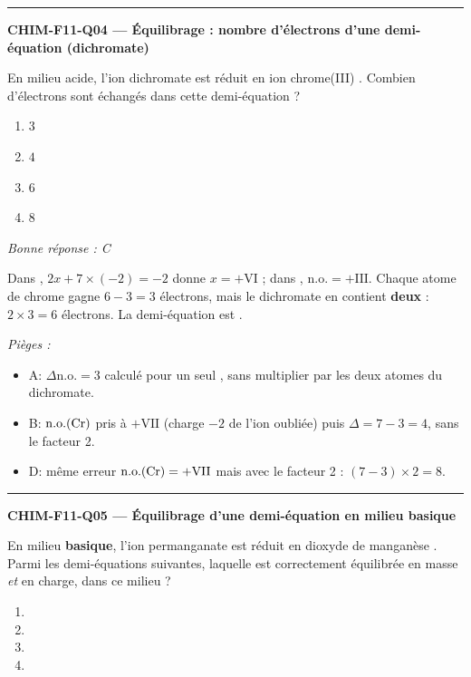\documentclass[11pt,a4paper]{article}
\begin{document}
\vspace{8pt}\hrule\vspace{8pt}
\noindent\textbf{CHIM-F11-Q04 --- Équilibrage : nombre d'électrons d'une demi-équation (dichromate)}\par
En milieu acide, l'ion dichromate  est réduit en ion chrome(III) . Combien d'électrons sont échangés dans cette demi-équation ?
\begin{enumerate}[label=\Alph*)]
\item $3$
\item $4$
\item $6$
\item $8$
\end{enumerate}
\textit{Bonne réponse : C}\par
Dans , $2x+7\times(-2)=-2$ donne $x=+\mathrm{VI}$ ; dans , $\mathrm{n.o.}=+\mathrm{III}$. Chaque atome de chrome gagne $6-3=3$ électrons, mais le dichromate en contient \textbf{deux} : $2\times3=6$ électrons. La demi-équation est .\par
\textit{Pièges :}
\begin{itemize}
\item A: $\Delta\mathrm{n.o.}=3$ calculé pour un seul , sans multiplier par les deux atomes du dichromate.
\item B: $\mathrm{n.o.}(\ce{Cr})$ pris à $+\mathrm{VII}$ (charge $-2$ de l'ion oubliée) puis $\Delta=7-3=4$, sans le facteur 2.
\item D: même erreur $\mathrm{n.o.}(\ce{Cr})=+\mathrm{VII}$ mais avec le facteur 2 : $(7-3)\times2=8$.
\end{itemize}
\vspace{8pt}\hrule\vspace{8pt}
\noindent\textbf{CHIM-F11-Q05 --- Équilibrage d'une demi-équation en milieu basique}\par
En milieu \textbf{basique}, l'ion permanganate  est réduit en dioxyde de manganèse . Parmi les demi-équations suivantes, laquelle est correctement équilibrée en masse \emph{et} en charge, dans ce milieu ?
\begin{enumerate}[label=\Alph*)]
\item {}
\item {}
\item {}
\item {}
\end{enumerate}
\end{document}
